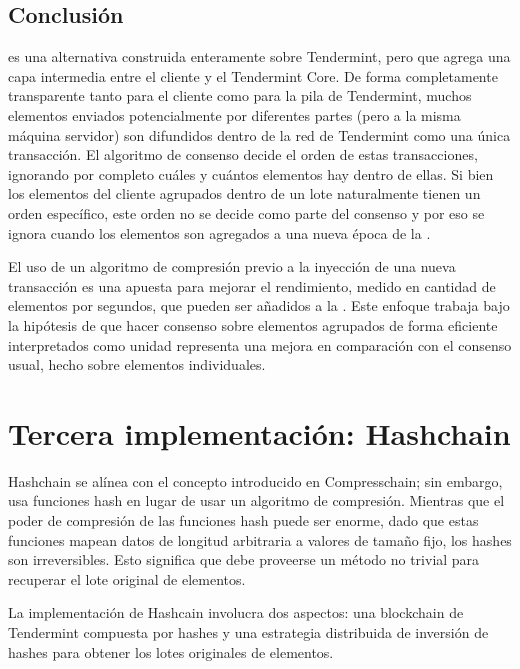 \subsection{Conclusión}
\compresschain es una alternativa construida enteramente sobre Tendermint, pero que agrega una capa
intermedia entre el cliente y el Tendermint Core.
De forma completamente transparente tanto para el
cliente como para la pila de Tendermint, muchos elementos enviados potencialmente por diferentes partes
(pero a la misma máquina servidor)
son difundidos dentro de la red de Tendermint como una única transacción.
El algoritmo de consenso
decide el orden de estas transacciones, ignorando por completo cuáles y cuántos elementos hay dentro de ellas.
Si bien los elementos del cliente agrupados dentro de un lote naturalmente tienen un orden específico,
este orden no se decide como parte del consenso y por eso se ignora cuando los elementos son agregados
a una nueva época de la \setchain.

%
El uso de un algoritmo de compresión previo a la inyección de una nueva transacción es una apuesta para mejorar
el rendimiento, medido en cantidad de elementos por segundos, que pueden ser añadidos a la \setchain.
Este enfoque trabaja bajo la hipótesis de que hacer consenso sobre elementos agrupados de forma
eficiente interpretados como unidad representa una mejora en comparación con el consenso usual,
hecho sobre elementos individuales.

\section{Tercera implementación: Hashchain}\label{sec:hashchain}
%
Hashchain se alínea con el concepto introducido en Compresschain; sin embargo, usa
funciones hash en lugar de usar un algoritmo de compresión.
%
Mientras que el poder de compresión de las funciones hash puede ser enorme, dado que estas funciones
mapean datos de longitud arbitraria a valores de tamaño fijo, los hashes son irreversibles.
%
Esto significa que debe proveerse un método no trivial para recuperar el lote original de elementos.

La implementación de Hashcain involucra dos aspectos: una blockchain de Tendermint compuesta por hashes
y una estrategia distribuida de inversión de hashes para obtener los lotes originales de elementos.
%

